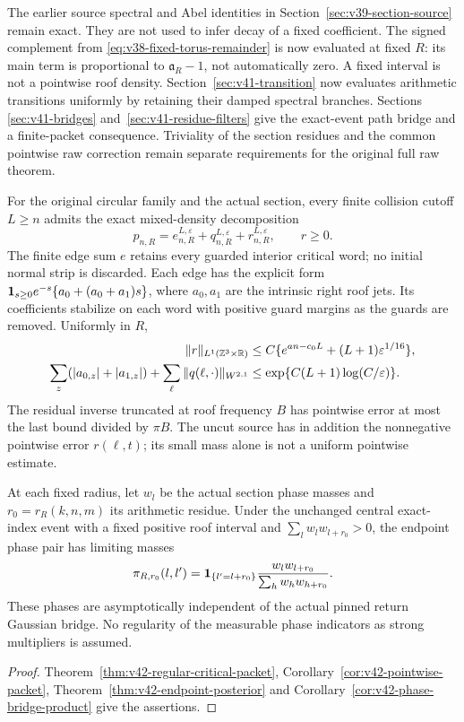 The earlier source spectral and Abel identities in
Section~\ref{sec:v39-section-source} remain exact. They are not used
to infer decay of a fixed coefficient. The signed complement from
\eqref{eq:v38-fixed-torus-remainder} is now evaluated at fixed $R$:
its main term is proportional to $\mathfrak a_R-1$, not automatically
zero. A fixed interval is not a pointwise roof density. Section~\ref{sec:v41-transition} now evaluates arithmetic transitions
uniformly by retaining their damped spectral branches. Sections~
\ref{sec:v41-bridges} and~\ref{sec:v41-residue-filters} give the
exact-event path bridge and a finite-packet consequence. Triviality of
the section residues and the common pointwise raw correction remain
separate requirements for the original full raw theorem.

\begin{leadtheorem}
\label{thm:intro-v42-critical-packet}
For the original circular family and the actual section, every finite
collision cutoff $L\ge n$ admits the exact mixed-density decomposition
\[
 p_{n,R}=e_{n,R}^{L,\varepsilon}+q_{n,R}^{L,\varepsilon}
                                +r_{n,R}^{L,\varepsilon},\qquad r\ge0.
\]
The finite edge sum $e$ retains every guarded interior critical word;
no initial normal strip is discarded. Each edge has the explicit form
$\mathbf1_{s\ge0}e^{-s}\{a_0+(a_0+a_1)s\}$, where $a_0,a_1$ are the
intrinsic right roof jets. Its coefficients stabilize on each word with positive guard margins
as the guards are removed. Uniformly in $R$,
\begin{align*}
 \|r\|_{L^1(\mathbb Z^3\times\mathbb R)}
   &\le C\{e^{an-c_0L}+(L+1)\varepsilon^{1/16}\},\\
 \sum_z(|a_{0,z}|+|a_{1,z}|)+\sum_\ell\|q(\ell,\cdot)\|_{W^{2,1}}
   &\le \exp\{C(L+1)\log(C/\varepsilon)\}.
\end{align*}
The residual inverse truncated at roof frequency $B$ has pointwise
error at most the last bound divided by $\pi B$. The uncut source has
in addition the nonnegative pointwise error $r(\ell,t)$; its small
mass alone is not a uniform pointwise estimate.

At each fixed radius, let $w_l$ be the actual section phase masses and
$r_0=r_R(k,n,m)$ its arithmetic residue. Under the unchanged central
exact-index event with a fixed positive roof interval and
$\sum_lw_lw_{l+r_0}>0$, the endpoint phase pair has limiting masses
\[
 \pi_{R,r_0}(l,l')=
 \mathbf1_{\{l'=l+r_0\}}\frac{w_lw_{l+r_0}}{\sum_hw_hw_{h+r_0}}.
\]
These phases are asymptotically independent of the actual pinned return
Gaussian bridge. No regularity of the measurable phase indicators as
strong multipliers is assumed.
\end{leadtheorem}
\begin{proof}
Theorem~\ref{thm:v42-regular-critical-packet},
Corollary~\ref{cor:v42-pointwise-packet},
Theorem~\ref{thm:v42-endpoint-posterior} and
Corollary~\ref{cor:v42-phase-bridge-product} give the assertions.
\end{proof}

